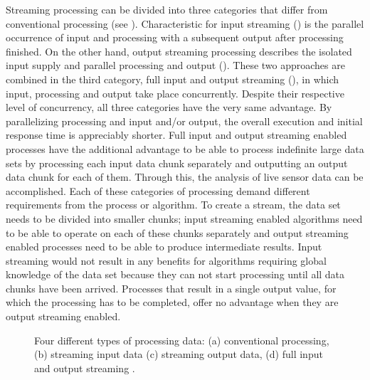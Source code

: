 Streaming processing can be divided into three categories that differ from conventional processing (see ). Characteristic for input streaming () is the parallel occurrence of input and processing with a subsequent output after processing finished. On the other hand, output streaming processing describes the isolated input supply and parallel processing and output (). These two approaches are combined in the third category, full input and output streaming (), in which input, processing and output take place concurrently. Despite their respective level of concurrency, all three categories have the very same advantage. By parallelizing processing and input and/or output, the overall execution and initial response time is appreciably shorter. Full input and output streaming enabled processes have the additional advantage to be able to process indefinite large data sets by processing each input data chunk separately and outputting an output data chunk for each of them. Through this, the analysis of live sensor data can be accomplished. Each of these categories of processing demand different requirements from the process or algorithm. To create a stream, the data set needs to be divided into smaller chunks; input streaming enabled algorithms need to be able to operate on each of these chunks separately and output streaming enabled processes need to be able to produce intermediate results. Input streaming would not result in any benefits for algorithms requiring global knowledge of the data set because they can not start processing until all data chunks have been arrived. Processes that result in a single output value, for which the processing has to be completed, offer no advantage when they are output streaming enabled.

\begin{figure}[!htb]
  \centering
  
  \caption{\label{fig:streaming}Four different types of processing data: (a) conventional processing, (b) streaming input data (c) streaming output data, (d) full input and output streaming \citep[based on][]{foerster2012live}.}
\end{figure}

